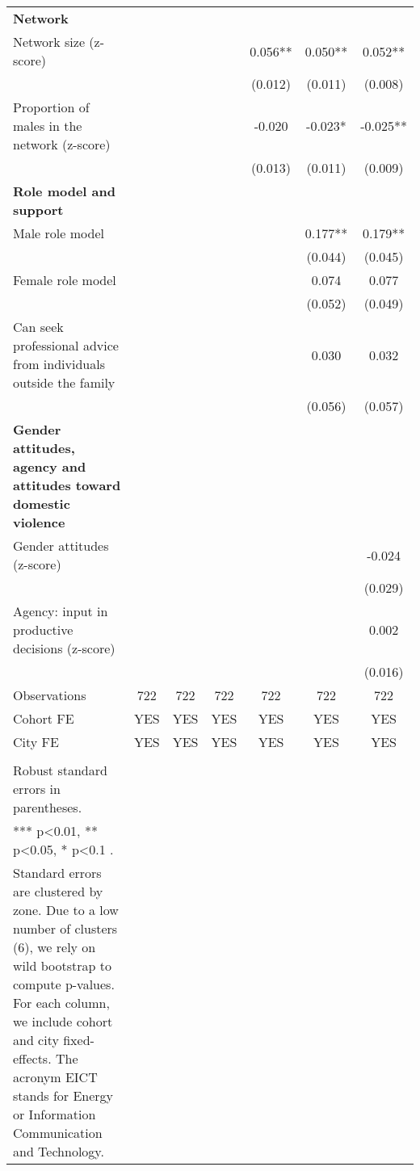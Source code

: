 \begin{landscape}
\begin{longtable}{m{9cm}cccccc}
\textbf{Network}&&&&&&\\
Network size (z-score)&&&&0.056**&0.050**&0.052**\\
&&&&(0.012)&(0.011)&(0.008)\\
Proportion of males in the network (z-score) &&&&-0.020&-0.023*&-0.025**\\
&&&&(0.013)&(0.011)&(0.009)\\
\textbf{Role model and support}&&&&&&\\
Male role model&&&&&0.177**&0.179**\\
&&&&&(0.044)&(0.045)\\
Female role model&&&&&0.074&0.077\\
&&&&&(0.052)&(0.049)\\
Can seek professional advice from individuals outside the family &&&&&0.030&0.032\\
&&&&&(0.056)&(0.057)\\
\textbf{Gender attitudes, agency and attitudes toward domestic violence}&&&&&&\\
Gender attitudes (z-score)&&&&&&-0.024\\
&&&&&&(0.029)\\
Agency: input in productive decisions (z-score) &&&&&&0.002\\
&&&&&&(0.016)\\
Observations&722&722&722&722&722&722\\
Cohort FE&YES&YES&YES&YES&YES&YES\\
City FE&YES&YES&YES&YES&YES&YES\\
\midrule
\begin{minipage}{21cm}
\small{
{\textit Notes:} \\
Robust standard errors in parentheses. \\
*** p\textless{}0.01, ** p\textless{}0.05, * p\textless{}0.1 . \\
Standard errors are clustered by zone. Due to a low number of clusters (6), we rely on wild bootstrap to compute p-values. For each column, we include cohort and city fixed-effects. The acronym EICT stands for Energy or Information Communication and Technology.
}
\end{minipage} \\* \bottomrule
\end{longtable}
\end{landscape}

